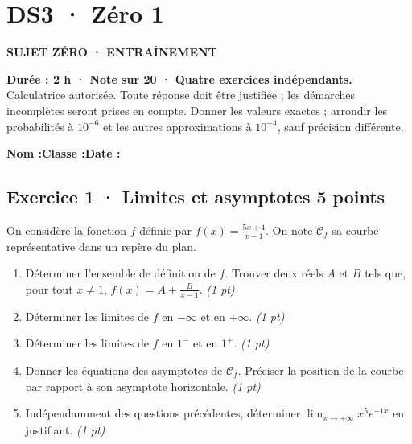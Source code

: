 \clearpage{}\label{sujet:4-1}

\section*{DS3 · Zéro 1}

{\sffamily\bfseries\color{teal}SUJET ZÉRO · ENTRAÎNEMENT\par}

\textbf{Durée : 2 h · Note sur 20 · Quatre exercices indépendants.}\\Calculatrice autorisée. Toute réponse doit être justifiée ; les démarches incomplètes seront prises en compte. Donner les valeurs exactes ; arrondir les probabilités à $10^{-6}$ et les autres approximations à $10^{-4}$, sauf précision différente.

\smallskip\textbf{Nom :}\enspace\dotfill\quad\textbf{Classe :}\enspace\dotfill\quad\textbf{Date :}\enspace\dotfill

\subsection*{Exercice 1 · Limites et asymptotes \hfill 5 points}On considère la fonction $f$ définie par $f(x)=\frac{5x+4}{x-1}$. On note $\mathcal C_f$ sa courbe représentative dans un repère du plan.

\begin{enumerate}

\item Déterminer l'ensemble de définition de $f$. Trouver deux réels $A$ et $B$ tels que, pour tout $x\ne1$, $f(x)=A+\frac B{x-1}$. \hfill\textit{(1 pt)}

\item Déterminer les limites de $f$ en $-\infty$ et en $+\infty$. \hfill\textit{(1 pt)}

\item Déterminer les limites de $f$ en $1^-$ et en $1^+$. \hfill\textit{(1 pt)}

\item Donner les équations des asymptotes de $\mathcal C_f$. Préciser la position de la courbe par rapport à son asymptote horizontale. \hfill\textit{(1 pt)}

\item Indépendamment des questions précédentes, déterminer $\displaystyle\lim_{x\to+\infty}x^{5}e^{-1x}$ en justifiant. \hfill\textit{(1 pt)}

\end{enumerate}

